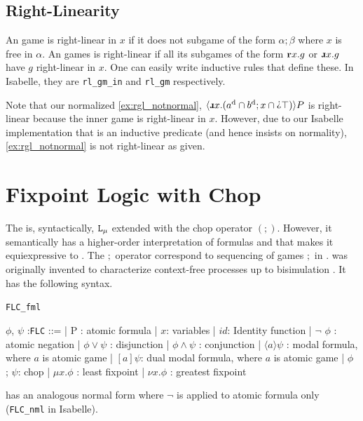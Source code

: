 \subsection{Right-Linearity}
An \RGL{} game is right-linear in $x$ if it does not subgame of the form $\alpha ; \beta$ where $x$ is free in $\alpha$. An \RGL{} games is right-linear if all its subgames of the form $\textbf{r} x. g$ or $\DRec x. g$ have $g$ right-linear in $x$. One can easily write inductive rules that define these. In Isabelle, they are \texttt{rl\_gm\_in} and \texttt{rl\_gm} respectively.

Note that our normalized \autoref{ex:rgl_notnormal}, $\langle\DRec x. (\Dual{a}\cap\Dual{b}; x\cap \DTest\top) \rangle P$ is right-linear because the inner game is right-linear in $x$. However, due to our Isabelle implementation that is an inductive predicate (and hence insists on normality), \autoref{ex:rgl_notnormal} is not right-linear as given.

\section{Fixpoint Logic with Chop}
The \FLC{} is, syntactically, $\texttt{L}_\mu{}$ extended with the chop operator $(;)$. However, it semantically has a higher-order interpretation of formulas and that makes it equiexpressive to \RGL{}. The $;$ operator correspond to sequencing of games $;$ in \RGL{}. \FLC{} was originally invented to characterize context-free processes up to bisimulation \cite{FLC}. It has the following syntax.

\begin{center}
\begin{bdefinition}
\texttt{FLC\_fml}

    \begin {bnf}
        $\phi$, $\psi$ :\texttt{FLC} ::=
        | P : atomic formula
        | $x$: variables
        | $id$: Identity function
        | $\neg$ $\phi$ : atomic negation
        | $\phi \vee\psi$ : disjunction
        | $\phi \wedge \psi$ : conjunction
        | $\langle a \rangle \psi$ : modal formula, where $a$ is atomic game
        | $[a] \psi$: dual modal formula, where $a$ is atomic game
        | $\phi$ ; $\psi$: chop
        | $\mu x. \phi$ : least fixpoint
        | $\nu x. \phi$ : greatest fixpoint
    \end{bnf}
\end{bdefinition}
\end{center}

\FLC{} has an analogous normal form where $\neg$ is applied to atomic formula only (\texttt{FLC\_nml} in Isabelle).

